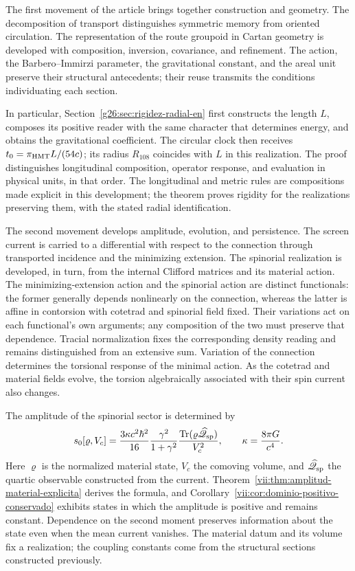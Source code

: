 The first movement of the article brings together construction and geometry.
The decomposition of transport distinguishes symmetric memory from oriented
circulation. The representation of the route groupoid in Cartan geometry
is developed with composition, inversion, covariance, and refinement.
The action, the Barbero--Immirzi parameter, the gravitational constant, and the
areal unit preserve their structural antecedents; their reuse
transmits the conditions individuating each section.

In particular, Section~\ref{g26:sec:rigidez-radial-en} first constructs
the length \(L\), composes its positive reader with the same character
that determines energy, and obtains the gravitational coefficient.
The circular clock then receives
\(t_0=\pi_{\rm HMT}L/(54c)\); its radius \(R_{108}\) coincides
with \(L\) in this realization. The proof distinguishes longitudinal
composition, operator response, and evaluation in physical units, in that
order. The longitudinal and metric rules are compositions made explicit
in this development; the theorem proves rigidity for the realizations
preserving them, with the stated radial identification.

The second movement develops amplitude, evolution, and persistence.
The screen current is carried to a differential with respect to the
connection through transported incidence and the minimizing extension.
The spinorial realization is developed, in turn, from the internal
Clifford matrices and its material action. The minimizing-extension
action and the spinorial action are distinct functionals: the former
generally depends nonlinearly on the connection, whereas the latter is
affine in contorsion with cotetrad and spinorial field fixed. Their
variations act on each functional's own arguments; any composition of
the two must preserve that dependence.
Tracial normalization
fixes the corresponding density reading and remains distinguished from
an extensive sum. Variation of the connection determines the torsional
response of the minimal action. As the cotetrad and material fields evolve,
the torsion algebraically associated with their spin current also changes.

The amplitude of the spinorial sector is determined by
\begin{equation}
 s_0[\varrho,V_c]
 =\frac{3\kappa c^2\hbar^2}{16}
   \frac{\gamma^2}{1+\gamma^2}
   \frac{\operatorname{Tr}
    (\varrho\widehat{\mathscr Q}_{\rm sp})}{V_c^2},
 \qquad \kappa=\frac{8\pi G}{c^4}.
 \label{vii:eq:programa-amplitud}
\end{equation}
Here \(\varrho\) is the normalized material state, \(V_c\) the comoving
volume, and \(\widehat{\mathscr Q}_{\rm sp}\) the quartic observable
constructed from the current.
Theorem~\ref{vii:thm:amplitud-material-explicita} derives the formula, and
Corollary~\ref{vii:cor:dominio-positivo-conservado} exhibits states
in which the amplitude is positive and remains constant. Dependence
on the second moment preserves information about the state even when
the mean current vanishes. The material datum and its volume fix a
realization; the coupling constants come from the structural
sections constructed previously.

